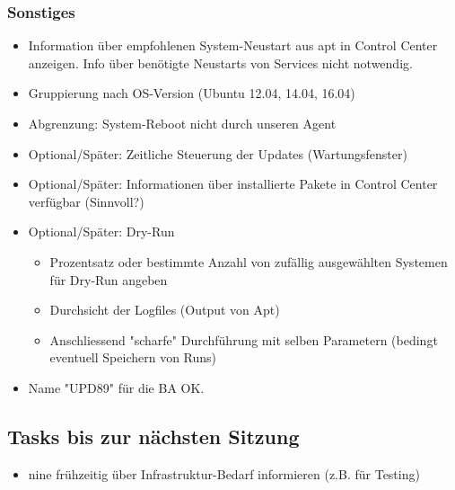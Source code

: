 \documentclass[class=scrbook,crop=false]{standalone}
\begin{document}
    \subsubsection{Sonstiges}
    
    \begin{itemize}
        \item Information über empfohlenen System-Neustart aus apt in Control Center anzeigen. Info über benötigte Neustarts von Services nicht notwendig.
        \item Gruppierung nach OS-Version (Ubuntu 12.04, 14.04, 16.04)
        \item Abgrenzung: System-Reboot nicht durch unseren Agent
        \item Optional/Später: Zeitliche Steuerung der Updates (Wartungsfenster)
        \item Optional/Später: Informationen über installierte Pakete in Control Center verfügbar (Sinnvoll?)
        \item Optional/Später: Dry-Run
        \begin{itemize}
            \item Prozentsatz oder bestimmte Anzahl von zufällig ausgewählten Systemen für Dry-Run angeben
            \item Durchsicht der Logfiles (Output von Apt)
            \item Anschliessend "scharfe" Durchführung mit selben Parametern (bedingt eventuell Speichern von Runs)
        \end{itemize}
        \item Name "UPD89" für die BA OK.
    \end{itemize}
    
    \subsection*{Tasks bis zur nächsten Sitzung}
    
    \begin{itemize}
        \item nine frühzeitig über Infrastruktur-Bedarf informieren (z.B. für Testing)
    \end{itemize}
\end{document}
